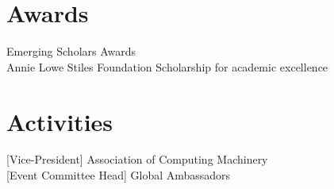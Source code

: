 \documentclass[]{deedy-resume-openfont}
\begin{document}
\begin{minipage}[t]{0.25\textwidth}
\section{Awards}
\textbullet{} Emerging Scholars Awards \\
\textbullet{} Annie Lowe Stiles Foundation Scholarship for academic excellence \\
\sectionsep

\section{Activities}
\textbullet{} [Vice-President] Association of Computing Machinery \\
\textbullet{} [Event Committee Head] Global Ambassadors \\ 
\sectionsep
%
%

\end{minipage} 
\hfill
\end{document}
